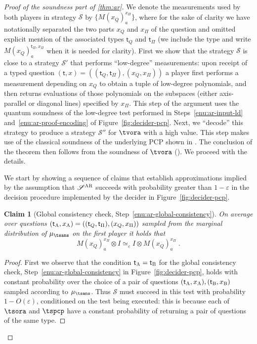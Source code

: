 \documentclass[11pt]{article}
\newtheorem{claim}[theorem]{Claim}
\theoremstyle{definition}
\newcommand{\ot}{\otimes}
\newcommand{\eps}{\varepsilon}
\newcommand{\strategy}{\mathscr{S}}
\newcommand{\gamestyle}[1]{\ensuremath{\textsc{#1}}\xspace}
\newcommand{\ar}{\gamestyle{AR}}
\newcommand{\labelstyle}[1]{\ensuremath{\textsc{#1}}\xspace}
\newcommand{\tvarstyle}[1]{\mathsf{#1}}
\newcommand{\tvar}{\ensuremath{\tvarstyle{t}}}
\newcommand{\alice}{\labelstyle{A}}
\newcommand{\bob}{\labelstyle{B}}
\begin{document}
\begin{proof}[Proof of the soundness part of \cref{thm:ar}]
  We denote the measurements used by both players in strategy $\strategy$ by
  $\{M({x}_Q)^{ {x}_{\Pi}}_{a}\}$, where for the sake of clarity we have
  notationally separated the two parts ${x}_Q$ and $x_\Pi$ of the question and
  omitted explicit mention of the associated types $\tvar_Q$ and $\tvar_\Pi$ (we
  include the type and write $M({x}_Q)^{\tvar_\Pi, {x}_{\Pi}}_{a}$ when it is
  needed for clarity).
  First we show that the strategy $\strategy$ is close to a strategy
  $\strategy'$ that performs ``low-degree'' measurements: upon receipt of a
  typed question $(\tvar,x)=((\tvar_Q,\tvar_\Pi),({x}_Q,x_\Pi))$ a player first
  performs a measurement depending on ${x}_Q$ to obtain a tuple of low-degree
  polynomials, and then returns evaluations of those polynomials on the
  subspaces (either axis-parallel or diagonal lines) specified by $x_\Pi$.
  This step of the argument uses the quantum soundness of the low-degree test
  performed in Steps~\ref{enu:ar-input-ld}
  and~\ref{enu:ar-proof-encoding} of Figure~\ref{fig:decider-pcp}.
  Next, we ``decode'' this strategy to produce a strategy $\strategy''$ for
  $\tvora$ with a high value.
  This step makes use of the classical soundness of the underlying PCP shown in
  .
  The conclusion of the theorem then follows from the soundness of
  $\tvora$ ().
  We proceed with the details.

	We start by showing a sequence of claims that establish approximations implied
  by the assumption that $\strategy^\ar$ succeeds with probability greater than 
  $1-\eps$ in the decision procedure implemented by the decider in
  Figure~\ref{fig:decider-pcp}.


  \begin{claim}[Global consistency check, Step~\ref{enu:ar-global-consistency}]
    \label{claim:ar-1}
    On average over questions
    $(\tvar_\alice,x_\alice)=((\tvar_Q,\tvar_\Pi),({x}_Q, x_{\Pi}))$ sampled
    from the marginal distribution of $ \mu_{\tsans}$ on the first player
    it holds that
    \begin{equation}
      \label{eq:global-consistency}
      M({x}_Q)^{x_{\Pi}}_a \ot I \simeq_{\eps} I \ot M({x}_Q)^{x_{\Pi}}_a\;.
    \end{equation}
  \end{claim}

  \begin{proof}
    First we observe that the condition $\tvar_\alice = \tvar_\bob$ for the
    global consistency check, Step~\ref{enu:ar-global-consistency} in
    Figure~\ref{fig:decider-pcp}, holds with constant probability over the
    choice of a pair of questions $(\tvar_\alice,x_\alice),(\tvar_\bob,x_\bob)$
    sampled according to $\mu_{\tsans}$.
    Thus $\strategy$ must succeed in this test with probability $1-O(\eps)$,
    conditioned on the test being executed: this is because each of
    $\tsora$ and $\tspcp$ have a constant probability of returning
    a pair of questions of the same type.


\end{proof}
\end{proof}
\end{document}
